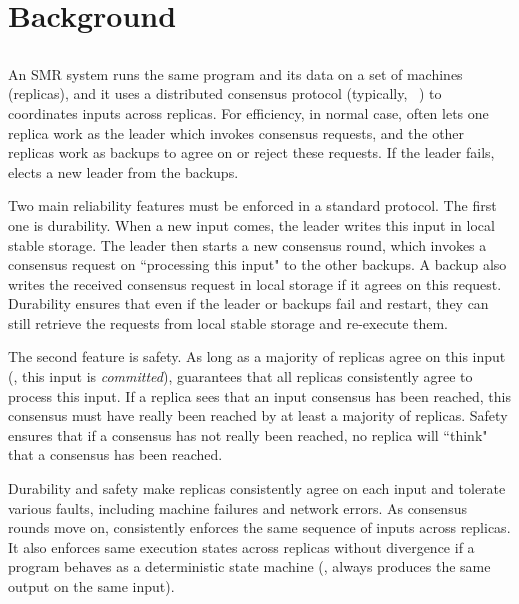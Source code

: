 \section{Background} \label{sec:background}


\subsection{\paxos}\label{sec:paxos}
An SMR system runs the same program and its data on a set of machines 
(replicas), and it uses a distributed consensus protocol (typically, 
\paxos~\cite{paxos:complex,paxos,paxos:simple,paxos:live,paxos:fast,
paxos:practical}) to coordinates inputs across replicas. For efficiency, in 
normal case, \paxos often lets one replica work as the leader which invokes 
consensus requests, and the other replicas work as backups to agree on or 
reject 
these requests. If the leader fails, \paxos elects a new leader from the 
backups.

Two main reliability features must be enforced in a standard \paxos protocol. 
The first one is durability. When a new input comes, the \paxos leader writes 
this input in local stable storage. The leader then starts a new consensus 
round, which invokes a consensus request on ``processing this input" to the 
other backups. A backup also writes the received consensus request in local 
storage if it agrees on this request. Durability ensures that even if the 
leader or backups fail and restart, they can still retrieve the requests from 
local stable storage and re-execute them.

The second feature is safety. As long as a majority of replicas agree on this 
input (\ie, this input is \emph{committed}), \paxos guarantees that all 
replicas consistently agree to process this input. If a replica sees that an 
input consensus has been reached, this consensus must have really been reached 
by at least a majority of replicas. Safety ensures that if a consensus has not 
really been reached, no replica will ``think" that a consensus has been 
reached.

Durability and safety make replicas consistently agree on each input and 
tolerate various faults, including machine failures and network errors. As 
consensus rounds move on, \paxos consistently enforces the same sequence of 
inputs across replicas. It also enforces same execution states across replicas 
without divergence if a program behaves as a deterministic state machine (\ie, 
always produces the same output on the same input).

